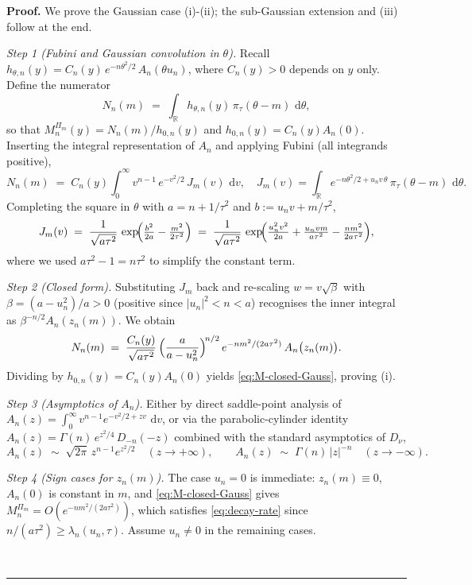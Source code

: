 \documentclass{article}%
\newenvironment{proof}[1][Proof]{\noindent\textbf{#1.} }{\ \rule{0.5em}{0.5em}}
\newcommand{\dd}{\,\mathrm{d}}
\newcommand{\1}{\mathbf{1}}
\begin{document}
\begin{proof}
    We prove the Gaussian case (i)-(ii); the sub-Gaussian extension and (iii) follow at the end.
 
\emph{Step 1 (Fubini and Gaussian convolution in $\theta$).} Recall $h_{\theta,n}(y) = C_{n}(y)\, e^{-n\theta^{2}/2}\, A_{n}(\theta u_{n})$, where $C_{n}(y)>0$ depends on $y$ only. Define the numerator
\[
   N_{n}(m) \;=\; \int_{\mathbb R} h_{\theta,n}(y)\,\pi_{\tau}(\theta-m)\,\dd\theta,
\]
so that $M_{n}^{\Pi_{m}}(y)=N_{n}(m)/h_{0,n}(y)$ and $h_{0,n}(y)=C_{n}(y)A_{n}(0)$. Inserting the integral representation of $A_{n}$ and applying Fubini (all integrands positive),
\[
   N_{n}(m) \;=\; C_{n}(y)\int_{0}^{\infty}v^{n-1}\,e^{-v^{2}/2}\, J_{m}(v)\,\dd v,
   \quad
   J_{m}(v)=\int_{\mathbb R} e^{-n\theta^{2}/2+u_{n}v\,\theta}\,\pi_{\tau}(\theta-m)\,\dd\theta.
\]
Completing the square in $\theta$ with $a=n+1/\tau^{2}$ and $b:=u_{n}v+m/\tau^{2}$,
\[
   J_{m}(v) \;=\; \frac{1}{\sqrt{a\tau^{2}}}\, \exp\!\Bigl(\tfrac{b^{2}}{2a}-\tfrac{m^{2}}{2\tau^{2}}\Bigr)
   \;=\; \frac{1}{\sqrt{a\tau^{2}}}\, \exp\!\Bigl(\tfrac{u_{n}^{2}v^{2}}{2a}+\tfrac{u_{n}vm}{a\tau^{2}}-\tfrac{nm^{2}}{2a\tau^{2}}\Bigr),
\]
where we used $a\tau^{2}-1=n\tau^{2}$ to simplify the constant term.

\emph{Step 2 (Closed form).} Substituting $J_{m}$ back and re-scaling $w=v\sqrt{\beta}$ with $\beta =(a-u_{n}^{2})/a>0$ (positive since $|u_{n}|^{2}<n<a$) recognises the inner integral as $\beta^{-n/2}A_{n}(z_{n}(m))$. We obtain
\[
   N_{n}(m) \;=\; \frac{C_{n}(y)}{\sqrt{a\tau^{2}}}\,\Bigl(\frac{a}{a-u_{n}^{2}}\Bigr)^{\!n/2}\, e^{-nm^{2}/(2a\tau^{2})}\, A_{n}\bigl(z_{n}(m)\bigr).
\]
Dividing by $h_{0,n}(y)=C_{n}(y)A_{n}(0)$ yields \eqref{eq:M-closed-Gauss}, proving (i).
 
\emph{Step 3 (Asymptotics of $A_{n}$).} Either by direct saddle-point analysis of $A_{n}(z)=\int_{0}^{\infty}v^{n-1}e^{-v^{2}/2+zv}\,\dd v$, or via the parabolic-cylinder identity $A_{n}(z)=\Gamma(n)\,e^{z^{2}/4}\,D_{-n}(-z)$ combined with the standard asymptotics of $D_{\nu}$,
\begin{equation}\label{eq:An-asymptotics}
   A_{n}(z)\;\sim\;\sqrt{2\pi}\,z^{n-1}e^{z^{2}/2}\quad (z\to+\infty),
   \qquad
   A_{n}(z)\;\sim\;\Gamma(n)\,|z|^{-n}\quad (z\to-\infty).
\end{equation}

\emph{Step 4 (Sign cases for $z_{n}(m)$).} The case $u_{n}=0$ is immediate: $z_{n}(m)\equiv 0$, $A_{n}(0)$ is constant in $m$, and \eqref{eq:M-closed-Gauss} gives $M_{n}^{\Pi_{m}}=O(e^{-nm^{2}/(2a\tau^{2})})$, which satisfies \eqref{eq:decay-rate} since $n/(a\tau^{2})\ge \lambda_{n}(u_{n},\tau)$. Assume $u_{n}\ne 0$ in the remaining cases.
 

\end{proof}
\end{document}
